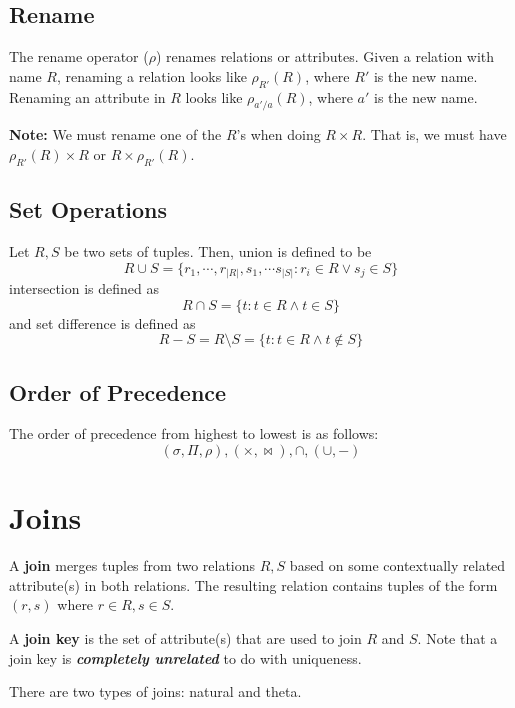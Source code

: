 \documentclass{report}
\newenvironment{definition}[1]{\begin{tcolorbox}[title={Definition: #1}]}{\end{tcolorbox}}
\renewcommand{\bf}[1]{\textbf{{#1}}}
\newcommand{\ib}[1]{\textit{\textbf{{#1}}}}
\begin{document}
\section{Rename}
\begin{definition}{Rename}
    The rename operator ($\rho$) renames relations or attributes. Given a relation with name $R$,
    renaming a relation looks like $\rho_{R'}(R)$, where $R'$ is the new name. Renaming an attribute
    in $R$ looks like $\rho_{a'/a}(R)$, where $a'$ is the new name. \vspace{10pt}
    
    \bf{Note:} We must rename one of the $R$'s when doing $R \times R$. That is, we must have
    $\rho_{R'}(R) \times R$ or $R \times \rho_{R'}(R)$.
\end{definition}

\section{Set Operations}
\begin{definition}{Set Operations (Union, Intersection, Set Difference)}
    Let $R, S$ be two sets of tuples. Then, union is defined to be
    \[R \cup S = \{ r_1, \cdots, r_{|R|}, s_1, \cdots s_{|S|} : r_i \in R \lor s_j \in S\}\]
    intersection is defined as
    \[R \cap S = \{ t : t \in R \land t \in S\}\]
    and set difference is defined as
    \[R - S = R \setminus S = \{ t : t \in R \land t \notin S\}\]
\end{definition}

\section{Order of Precedence}
The order of precedence from highest to lowest is as follows:
\[(\sigma, \Pi, \rho), (\times, \bowtie), \cap, (\cup, -)\]





\chapter{Joins}
\begin{definition}{Join}
    A \bf{join} merges tuples from two relations $R, S$ based on some contextually related
    attribute(s) in both relations. The resulting relation contains tuples of the form $(r, s)$
    where $r \in R, s \in S$. \vspace{12pt}

    A \bf{join key} is the set of attribute(s) that are used to join $R$ and $S$. Note that a join
    key is \ib{completely unrelated} to do with uniqueness.
\end{definition}
There are two types of joins: natural and theta.
\end{document}
